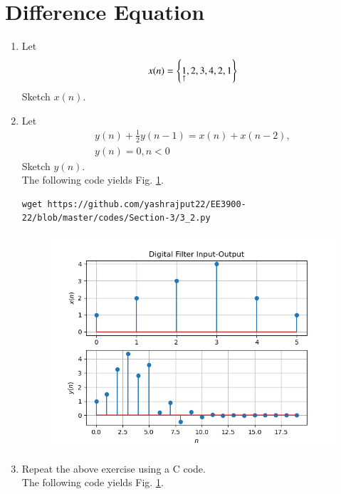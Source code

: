 \documentclass[journal,12pt,twocolumn]{IEEEtran}
\renewcommand\thesection{\arabic{section}}
\begin{document}
\section{Difference Equation}
\begin{enumerate}[label=\thesection.\arabic*,ref=\thesection.\theenumi]
\item Let
\begin{equation}
x(n) = \left\{\underset{\uparrow}{1},2,3,4,2,1\right\}
\end{equation}
Sketch $x(n)$.
\item Let
\begin{multline}
\label{eq:iir_filter}
y(n) + \frac{1}{2}y(n-1) = x(n) + x(n-2), 
\\
 y(n) = 0, n < 0
\end{multline}
Sketch $y(n)$.  
\\
\solution The following code yields Fig. \ref{fig:xnyn}.
\begin{lstlisting}
wget https://github.com/yashrajput22/EE3900-22/blob/master/codes/Section-3/3_2.py
\end{lstlisting}
\begin{figure}[!ht]
\begin{center}
\includegraphics[width=\columnwidth]{./figs/3_2}
\end{center}
\label{fig:xnyn}	
\end{figure}
\item Repeat the above exercise using a C code.
\\
\solution The following code yields Fig. \ref{fig:xnyn}.
\begin{lstlisting}

\end{lstlisting}
\end{enumerate}
\end{document}

